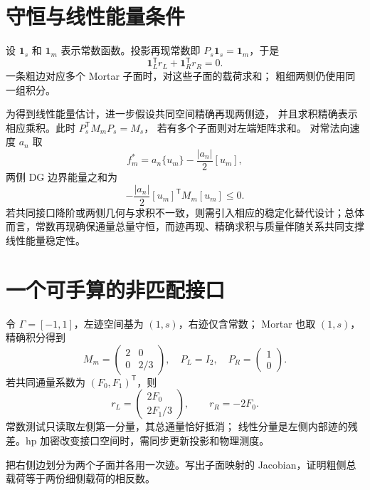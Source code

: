 \section{守恒与线性能量条件}
设 $\bm1_s$ 和 $\bm1_m$ 表示常数函数。投影再现常数即
$P_s\bm1_s=\bm1_m$，于是
\[
\bm1_L^{\mathsf T}r_L+\bm1_R^{\mathsf T}r_R=0.
\]
一条粗边对应多个 Mortar 子面时，对这些子面的载荷求和；
粗细两侧仍使用同一组积分。

为得到线性能量估计，进一步假设共同空间精确再现两侧迹，
并且求积精确表示相应乘积。此时
$P_s^{\mathsf T}M_mP_s=M_s$，
若有多个子面则对左端矩阵求和。
对常法向速度 $a_n$ 取
\[
f_m^*=a_n\{u_m\}-\frac{|a_n|}{2}[u_m],
\]
两侧 DG 边界能量之和为
\[
-\frac{|a_n|}{2}[u_m]^{\mathsf T}M_m[u_m]\le0.
\]
若共同接口降阶或两侧几何与求积不一致，则需引入相应的稳定化替代设计；总体而言，常数再现确保通量总量守恒，而迹再现、精确求积与质量伴随关系共同支撑线性能量稳定性。

\section{一个可手算的非匹配接口}
令 $\Gamma=[-1,1]$，左迹空间基为 $(1,s)$，右迹仅含常数；
Mortar 也取 $(1,s)$，精确积分得到
\[
M_m=\begin{pmatrix}2&0\\0&2/3\end{pmatrix},\quad
P_L=I_2,\quad P_R=\begin{pmatrix}1\\0\end{pmatrix}.
\]
若共同通量系数为 $(F_0,F_1)^{\mathsf T}$，则
\[
r_L=\begin{pmatrix}2F_0\\2F_1/3\end{pmatrix},\qquad r_R=-2F_0.
\]
常数测试只读取左侧第一分量，其总通量恰好抵消；
线性分量是左侧内部迹的残差。hp 加密改变接口空间时，需同步更新投影和物理测度。

{把右侧边划分为两个子面并各用一次迹。写出子面映射的 Jacobian，证明粗侧总载荷等于两份细侧载荷的相反数。}

